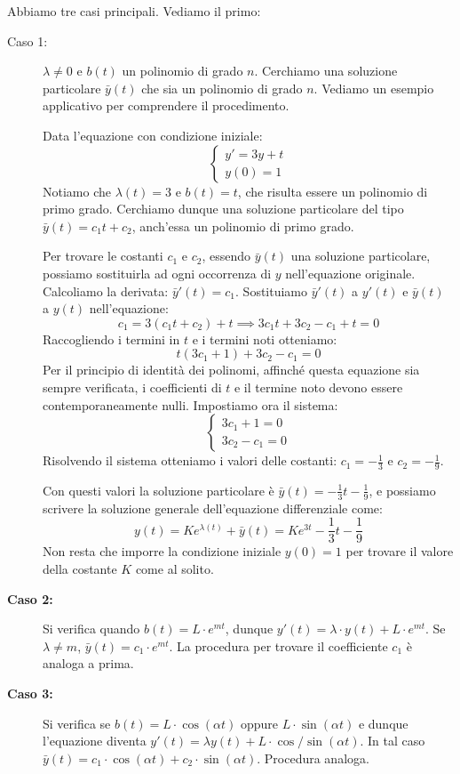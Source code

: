 \documentclass[12pt]{report}
\begin{document}
	Abbiamo tre casi principali. Vediamo il primo:
	\begin{description}
		
		\item [Caso 1:] $\lambda \neq 0$ e $b(t)$ un polinomio di grado $n$. Cerchiamo una soluzione particolare $\bar{y}(t)$ che sia un polinomio di grado $n$.
		Vediamo un esempio applicativo per comprendere il procedimento.
		\begin{osservazione}{}{}
			
			Data l'equazione con condizione iniziale:
			\[
			\begin{cases}
				y' = 3y + t \\
				y(0) = 1
			\end{cases}
			\]
			Notiamo che $\lambda(t) = 3$ e $b(t) = t$, che risulta essere un polinomio di primo grado.
			Cerchiamo dunque una soluzione particolare del tipo $\bar{y}(t) = c_1 t + c_2$, anch'essa un polinomio di primo grado.
			
			Per trovare le costanti $c_1$ e $c_2$, essendo $\bar{y}(t)$ una soluzione particolare, possiamo sostituirla ad ogni occorrenza di $y$ nell'equazione originale.
			Calcoliamo la derivata: $\bar{y}'(t) = c_1$. Sostituiamo $\bar{y}'(t)$ a $y'(t)$ e $\bar{y}(t)$ a $y(t)$ nell'equazione:
			\[
			c_1 = 3(c_1 t + c_2) + t \implies 3c_1 t + 3c_2 - c_1 + t = 0
			\]
			Raccogliendo i termini in $t$ e i termini noti otteniamo:
			\[
			t(3c_1 + 1) + 3c_2 - c_1 = 0
			\]
			Per il principio di identità dei polinomi, affinché questa equazione sia sempre verificata, i coefficienti di $t$ e il termine noto devono essere contemporaneamente nulli. Impostiamo ora il sistema:
			\[
			\begin{cases}
				3c_1 + 1 = 0 \\
				3c_2 - c_1 = 0
			\end{cases}
			\]
			Risolvendo il sistema otteniamo i valori delle costanti: $c_1 = -\frac{1}{3}$ e $c_2 = -\frac{1}{9}$.
			
			Con questi valori la soluzione particolare è $\bar{y}(t) = -\frac{1}{3}t - \frac{1}{9}$, e possiamo scrivere la soluzione generale dell'equazione differenziale come:
			\[
			y(t) = K e^{\lambda(t)} + \bar{y}(t) = K e^{3t} - \frac{1}{3}t - \frac{1}{9}
			\]
			Non resta che imporre la condizione iniziale $y(0) = 1$ per trovare il valore della costante $K$ come al solito.
			
		\end{osservazione}
		
		\item[\textbf{Caso 2:}] Si verifica quando $b(t) = L \cdot e^{mt}$, dunque $y'(t) = \lambda \cdot y(t) + L \cdot e^{mt}$.
		Se $\lambda \neq m$, $\bar{y}(t) = c_1 \cdot e^{mt}$. La procedura per trovare il coefficiente $c_1$ è analoga a prima.
		
		\item[\textbf{Caso 3:}] Si verifica se $b(t) = L \cdot \cos(\alpha t)$ oppure $L \cdot \sin(\alpha t)$ e dunque l'equazione diventa $y'(t) = \lambda y(t) + L \cdot \cos/\sin(\alpha t)$.
		In tal caso $\bar{y}(t) = c_1 \cdot \cos(\alpha t) + c_2 \cdot \sin(\alpha t)$. Procedura analoga.
		
	\end{description}
	
\end{document}
